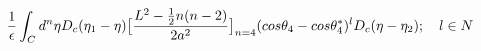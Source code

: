 \begin{equation}
\frac{1}{\epsilon}
\int_Cd^n\eta D_c(\eta_1 - \eta)\big{[}\frac{L^2 - \frac{1}{2}n(n-2)}{2a^2}\big{]}_{n=4}
(cos{\theta_4} - cos{\theta_4^*})^lD_c(\eta - \eta_2);~~~l \in N 
\end{equation}

